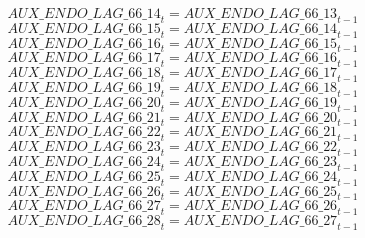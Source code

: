 \begin{dmath}
{AUX\_ENDO\_LAG\_66\_14}_{t}={AUX\_ENDO\_LAG\_66\_13}_{t-1}
\end{dmath}
\begin{dmath}
{AUX\_ENDO\_LAG\_66\_15}_{t}={AUX\_ENDO\_LAG\_66\_14}_{t-1}
\end{dmath}
\begin{dmath}
{AUX\_ENDO\_LAG\_66\_16}_{t}={AUX\_ENDO\_LAG\_66\_15}_{t-1}
\end{dmath}
\begin{dmath}
{AUX\_ENDO\_LAG\_66\_17}_{t}={AUX\_ENDO\_LAG\_66\_16}_{t-1}
\end{dmath}
\begin{dmath}
{AUX\_ENDO\_LAG\_66\_18}_{t}={AUX\_ENDO\_LAG\_66\_17}_{t-1}
\end{dmath}
\begin{dmath}
{AUX\_ENDO\_LAG\_66\_19}_{t}={AUX\_ENDO\_LAG\_66\_18}_{t-1}
\end{dmath}
\begin{dmath}
{AUX\_ENDO\_LAG\_66\_20}_{t}={AUX\_ENDO\_LAG\_66\_19}_{t-1}
\end{dmath}
\begin{dmath}
{AUX\_ENDO\_LAG\_66\_21}_{t}={AUX\_ENDO\_LAG\_66\_20}_{t-1}
\end{dmath}
\begin{dmath}
{AUX\_ENDO\_LAG\_66\_22}_{t}={AUX\_ENDO\_LAG\_66\_21}_{t-1}
\end{dmath}
\begin{dmath}
{AUX\_ENDO\_LAG\_66\_23}_{t}={AUX\_ENDO\_LAG\_66\_22}_{t-1}
\end{dmath}
\begin{dmath}
{AUX\_ENDO\_LAG\_66\_24}_{t}={AUX\_ENDO\_LAG\_66\_23}_{t-1}
\end{dmath}
\begin{dmath}
{AUX\_ENDO\_LAG\_66\_25}_{t}={AUX\_ENDO\_LAG\_66\_24}_{t-1}
\end{dmath}
\begin{dmath}
{AUX\_ENDO\_LAG\_66\_26}_{t}={AUX\_ENDO\_LAG\_66\_25}_{t-1}
\end{dmath}
\begin{dmath}
{AUX\_ENDO\_LAG\_66\_27}_{t}={AUX\_ENDO\_LAG\_66\_26}_{t-1}
\end{dmath}
\begin{dmath}
{AUX\_ENDO\_LAG\_66\_28}_{t}={AUX\_ENDO\_LAG\_66\_27}_{t-1}
\end{dmath}
